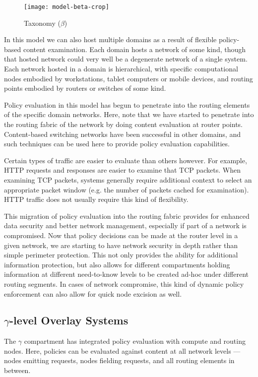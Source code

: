 \begin{figure}[!t]
\centering
\texttt{[image: model-beta-crop]}
\caption{Taxonomy ($\beta$)}
\label{fig:model:taxonomy-beta}
\end{figure}

In this model we can also host multiple domains as a result of flexible policy-based content examination.  Each domain hosts a network of some kind, though that hosted network could very well be a degenerate network of a single system.  Each network hosted in a domain is hierarchical, with specific computational nodes embodied by workstations, tablet computers or mobile devices, and routing points embodied by routers or switches of some kind.

Policy evaluation in this model has begun to penetrate into the routing elements of the specific domain networks.  Here, note that we have started to penetrate into the routing fabric of the network by doing content evaluation at router points.  Content-based switching networks have been successful in other domains, and such techniques can be used here to provide policy evaluation capabilities.  

Certain types of traffic are easier to evaluate than others however.  For example, HTTP requests and responses are easier to examine that TCP packets.  When examining TCP packets, systems generally require additional context to select an appropriate packet window (e.g. the number of packets cached for examination).  HTTP traffic does not usually require this kind of flexibility.

This migration of policy evaluation into the routing fabric provides for enhanced data security and better network management, especially if part of a network is compromised.  Now that policy decisions can be made at the router level in a given network, we are starting to have network security in depth rather than simple perimeter protection.  This not only provides the ability for additional information protection, but also allows for different compartments holding information at different need-to-know levels to be created ad-hoc under different routing segments.  In cases of network compromise, this kind of dynamic policy enforcement can also allow for quick node excision as well.

\subsection{$\gamma$-level Overlay Systems}
The $\gamma$ compartment has integrated policy evaluation with compute and routing nodes.  Here, policies can be evaluated against content at all network levels --- nodes emitting requests, nodes fielding requests, and all routing elements in between.

